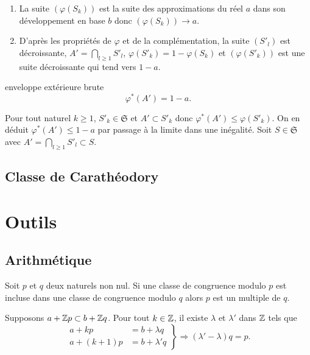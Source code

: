 \begin{rems}
  \begin{enumerate}
   \item La suite $(\varphi(S_k))$ est la suite des approximations du réel $a$ dans son développement en base $b$ donc $(\varphi(S_k)) \rightarrow a$.
   \item D'après les propriétés de $\varphi$ et de la complémentation, la suite $(S'_l)$ est décroissante, $A' = \bigcap_{l\geq 1} S'_l$, $\varphi(S'_k) = 1 - \varphi(S_k)$ et
   $(\varphi(S'_k))$ est une suite décroissante qui tend vers $1-a$.
  \end{enumerate}
 \end{rems}
\begin{prop}{enveloppe extérieure brute}
 \begin{displaymath}
  \varphi^*(A') = 1 - a .
 \end{displaymath}
\end{prop}
\begin{demo}
 Pour tout naturel $k\geq 1$, $S'_k \in \mathfrak{S}$ et $A' \subset S'_k$ donc $\varphi^*(A') \leq \varphi(S'_k)$. On en déduit $\varphi^*(A') \leq 1-a$ par passage à la limite dans une inégalité.\newline
 Soit $S \in \mathfrak{S}$ avec  $A'= \bigcap_{l\geq 1} S'_l \subset S$.
\end{demo}
\subsection{Classe de Carathéodory} \label{ClasseCaratheodory}

\section{Outils} \label{Outils}

\subsection{Arithmétique}
\begin{propn}
Soit $p$ et $q$ deux naturels non nul. Si une classe de congruence modulo $p$ est incluse dans une classe de congruence modulo $q$ alors $p$ est un multiple de $q$.
\end{propn}
\begin{demo}
 Supposons $a+\mathbb{Z} p \subset b + \mathbb{Z} q$. Pour tout $k \in \mathbb{Z}$, il existe $\lambda$ et $\lambda'$ dans $\mathbb{Z}$ tels que
\begin{displaymath}
 \left.
   \begin{aligned}
    a + kp &= b + \lambda q \\
    a + (k+1)p &= b + \lambda' q
   \end{aligned}
  \right\rbrace
  \Rightarrow (\lambda' - \lambda) q = p.
\end{displaymath}
\end{demo}

